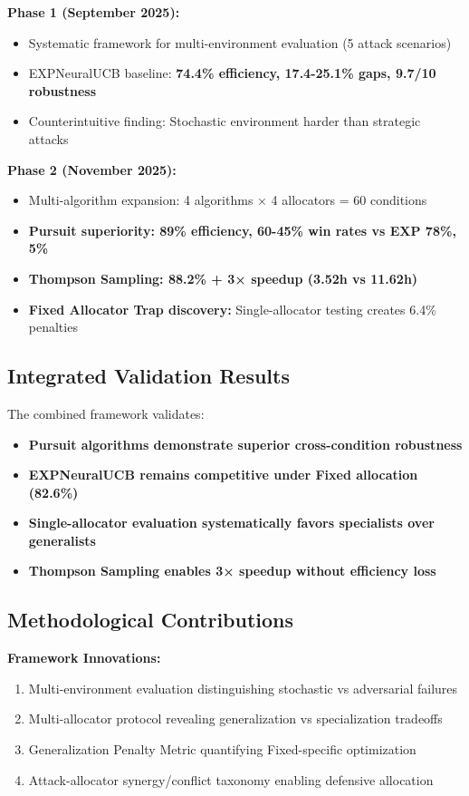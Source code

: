 \documentclass[11pt,a4paper]{article}
\newcommand{\performance}[1]{\textcolor{performancecolor}{\textbf{#1}}}
\newcommand{\critical}[1]{\textcolor{criticalcolor}{\textbf{#1}}}
\newcommand{\success}[1]{\textcolor{successcolor}{\textbf{#1}}}
\begin{document}
\textbf{Phase 1 (September 2025):}
\begin{itemize}
    \item Systematic framework for multi-environment evaluation (5 attack scenarios)
    \item EXPNeuralUCB baseline: \performance{74.4\% efficiency, 17.4-25.1\% gaps, 9.7/10 robustness}
    \item Counterintuitive finding: Stochastic environment harder than strategic attacks
\end{itemize}

\textbf{Phase 2 (November 2025):}
\begin{itemize}
    \item Multi-algorithm expansion: 4 algorithms × 4 allocators = 60 conditions
    \item \success{Pursuit superiority: 89\% efficiency, 60-45\% win rates vs EXP 78\%, 5\%}
    \item \success{Thompson Sampling: 88.2\% + 3× speedup (3.52h vs 11.62h)}
    \item \textbf{Fixed Allocator Trap discovery:} Single-allocator testing creates 6.4\% penalties
\end{itemize}

\subsection{Integrated Validation Results}

The combined framework validates:
\begin{itemize}
    \item \success{Pursuit algorithms demonstrate superior cross-condition robustness}
    \item \performance{EXPNeuralUCB remains competitive under Fixed allocation (82.6\%)}
    \item \critical{Single-allocator evaluation systematically favors specialists over generalists}
    \item \success{Thompson Sampling enables 3× speedup without efficiency loss}
\end{itemize}

\subsection{Methodological Contributions}

\textbf{Framework Innovations:}
\begin{enumerate}
    \item Multi-environment evaluation distinguishing stochastic vs adversarial failures
    \item Multi-allocator protocol revealing generalization vs specialization tradeoffs
    \item Generalization Penalty Metric quantifying Fixed-specific optimization
    \item Attack-allocator synergy/conflict taxonomy enabling defensive allocation
\end{enumerate}
\end{document}

